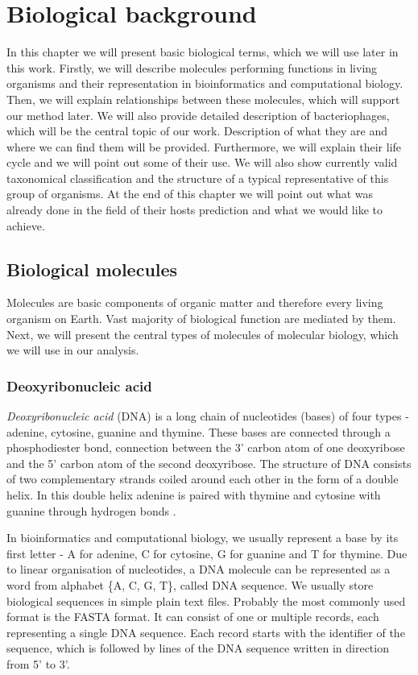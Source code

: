 \chapter{Biological background}
In this chapter we will present basic biological terms, which we will use later in this work.
Firstly, we will describe molecules performing functions in living organisms and their representation in bioinformatics and computational biology.
Then, we will explain relationships between these molecules, which will support our method later.
We will also provide detailed description of bacteriophages, which will be the central topic of our work.
Description of what they are and where we can find them will be provided.
Furthermore, we will explain their life cycle and we will point out some of their use.
We will also show currently valid taxonomical classification and the structure of a typical representative of this group of organisms.
At the end of this chapter we will point out what was already done in the field of their hosts prediction and what we would like to achieve.

\section{Biological molecules}
Molecules are basic components of organic matter and therefore every living organism on Earth.
Vast majority of biological function are mediated by them.
Next, we will present the central types of molecules of molecular biology, which we will use in our analysis.

\subsection{Deoxyribonucleic acid}
\emph{Deoxyribonucleic acid} (DNA) is a long chain of nucleotides (bases) of four types - adenine, cytosine, guanine and thymine.
These bases are connected through a phosphodiester bond, connection between the 3' carbon atom of one deoxyribose and the 5' carbon atom of the second deoxyribose.
The structure of DNA consists of two complementary strands coiled around each other in the form of a double helix.
In this double helix adenine is paired with thymine and cytosine with guanine through hydrogen bonds \cite{}.

In bioinformatics and computational biology, we usually represent a base by its first letter - A for adenine, C for cytosine, G for guanine and T for thymine.
Due to linear organisation of nucleotides, a DNA molecule can be represented as a word from alphabet \{A, C, G, T\}, called DNA sequence. We usually store biological sequences in simple plain text files.
Probably the most commonly used format is the FASTA format.
It can consist of one or multiple records, each representing a single DNA sequence.
Each record starts with the identifier of the sequence, which is followed by lines of the DNA sequence written in direction from 5' to 3'.

